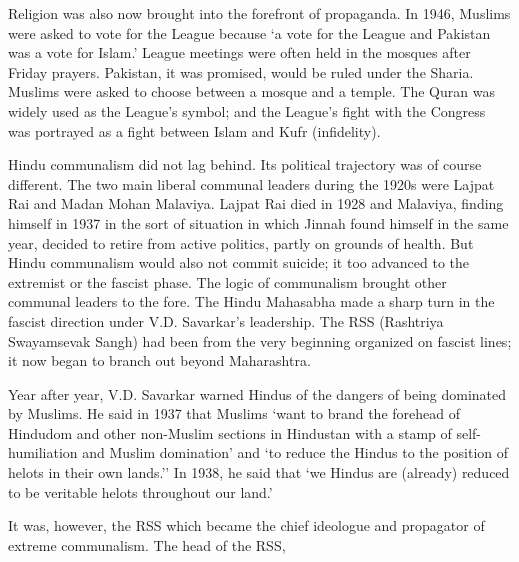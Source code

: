 Religion was also now brought into the forefront of propaganda. In 1946, Muslims were asked to vote for the League because `a vote for the League and Pakistan was a vote for Islam.' League meetings were often held in the mosques after Friday prayers. Pakistan, it was promised, would be ruled under the Sharia. Muslims were asked to choose between a mosque and a temple. The Quran was widely used as the League's symbol; and the League's fight with the Congress was portrayed as a fight between Islam and Kufr (infidelity). 

Hindu communalism did not lag behind. Its political trajectory was of course different. The two main liberal communal leaders during the 1920s were Lajpat Rai and Madan Mohan Malaviya. Lajpat Rai died in 1928 and Malaviya, finding himself in 1937 in the sort of situation in which Jinnah found himself in the same year, decided to retire from active politics, partly on grounds of health. But Hindu communalism would also not commit suicide; it too advanced to the extremist or the fascist phase. The logic of communalism brought other communal leaders to the fore. The Hindu Mahasabha made a sharp turn in the fascist direction under V.D. Savarkar's leadership. The RSS (Rashtriya Swayamsevak Sangh) had been from the very beginning organized on fascist lines; it now began to branch out beyond Maharashtra. 

Year after year, V.D. Savarkar warned Hindus of the dangers of being dominated by Muslims. He said in 1937 that Muslims `want to brand the forehead of Hindudom and other non-Muslim sections in Hindustan with a stamp of self- humiliation and Muslim domination' and `to reduce the Hindus to the position of helots in their own lands.'' In 1938, he said that `we Hindus are (already) reduced to be veritable helots throughout our land.' 

It was, however, the RSS which became the chief ideologue and propagator of extreme communalism. The head of the RSS, 


